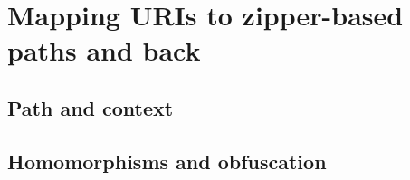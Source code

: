 \section{Mapping URIs to zipper-based paths and back}

\subsection{Path and context}

\subsection{Homomorphisms and obfuscation}